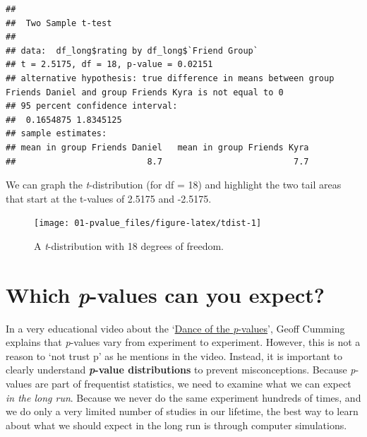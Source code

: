 \documentclass[
  oneside]{book}
\newenvironment{Shaded}{\begin{snugshade}}{\end{snugshade}}
\newcommand{\AttributeTok}[1]{\textcolor[rgb]{0.77,0.63,0.00}{#1}}
\newcommand{\ConstantTok}[1]{\textcolor[rgb]{0.00,0.00,0.00}{#1}}
\newcommand{\FunctionTok}[1]{\textcolor[rgb]{0.00,0.00,0.00}{#1}}
\newcommand{\NormalTok}[1]{#1}
\newcommand{\SpecialCharTok}[1]{\textcolor[rgb]{0.00,0.00,0.00}{#1}}
\newcommand{\StringTok}[1]{\textcolor[rgb]{0.31,0.60,0.02}{#1}}
\begin{document}
\begin{Shaded}
\end{Shaded}

\begin{verbatim}
## 
##  Two Sample t-test
## 
## data:  df_long$rating by df_long$`Friend Group`
## t = 2.5175, df = 18, p-value = 0.02151
## alternative hypothesis: true difference in means between group Friends Daniel and group Friends Kyra is not equal to 0
## 95 percent confidence interval:
##  0.1654875 1.8345125
## sample estimates:
## mean in group Friends Daniel   mean in group Friends Kyra 
##                          8.7                          7.7
\end{verbatim}

We can graph the \emph{t}-distribution (for df = 18) and highlight the two tail areas that start at the t-values of 2.5175 and -2.5175.



\begin{figure}

{\centering \texttt{[image: 01-pvalue\_files/figure-latex/tdist-1]} 

}

\caption{A \emph{t}-distribution with 18 degrees of freedom.}\label{fig:tdist}
\end{figure}

\hypertarget{which-p-values-can-you-expect}{%
\section{\texorpdfstring{Which \emph{p}-values can you expect?}{Which p-values can you expect?}}\label{which-p-values-can-you-expect}}

In a very educational video about the `\href{https://www.youtube.com/watch?v=5OL1RqHrZQ8}{Dance of the \emph{p}-values}', Geoff Cumming explains that \emph{p}-values vary from experiment to experiment. However, this is not a reason to `not trust p' as he mentions in the video. Instead, it is important to clearly understand \textbf{\emph{p}-value distributions} to prevent misconceptions. Because \emph{p}-values are part of frequentist statistics, we need to examine what we can expect \emph{in the long run}. Because we never do the same experiment hundreds of times, and we do only a very limited number of studies in our lifetime, the best way to learn about what we should expect in the long run is through computer simulations.
\end{document}
